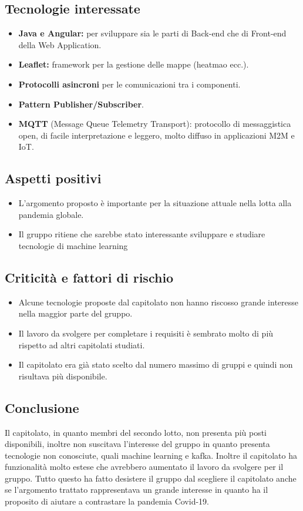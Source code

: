 \subsection{Tecnologie interessate}
\begin{itemize}
    \item \textbf{Java e Angular:} per sviluppare sia le parti di Back-end che di Front-end della Web Application.
    \item \textbf{Leaflet:} framework per la gestione delle mappe (heatmao ecc.).
    \item \textbf{Protocolli asincroni} per le comunicazioni tra i componenti.
    \item \textbf{Pattern Publisher/Subscriber}.
    \item \textbf{MQTT} (Message Queue Telemetry Transport): protocollo di messaggistica open, di facile interpretazione e leggero, molto diffuso in applicazioni M2M e IoT.
\end{itemize}

\subsection{Aspetti positivi}
\begin{itemize}
    \item L'argomento proposto è importante per la situazione attuale nella lotta alla pandemia globale.
    \item Il gruppo ritiene che sarebbe stato interessante sviluppare e studiare tecnologie di machine learning
\end{itemize}

\subsection{Criticità e fattori di rischio}
\begin{itemize}
    \item Alcune tecnologie proposte dal capitolato non hanno riscosso grande interesse nella maggior parte del gruppo.
    \item Il lavoro da svolgere per completare i requisiti è sembrato molto di più rispetto ad altri capitolati studiati.
    \item Il capitolato era già stato scelto dal numero massimo di gruppi e quindi non risultava più disponibile.
\end{itemize}
\subsection{Conclusione}
Il capitolato, in quanto membri del secondo lotto, non presenta più posti disponibili, inoltre non suscitava l'interesse del gruppo in quanto presenta tecnologie non conosciute, 
quali machine learning e kafka. Inoltre il capitolato ha funzionalità molto estese che avrebbero aumentato il lavoro da svolgere per il gruppo. Tutto questo ha fatto desistere il gruppo dal scegliere il capitolato 
anche se l'argomento trattato rappresentava un grande interesse in quanto ha il proposito di aiutare a contrastare la pandemia Covid-19.